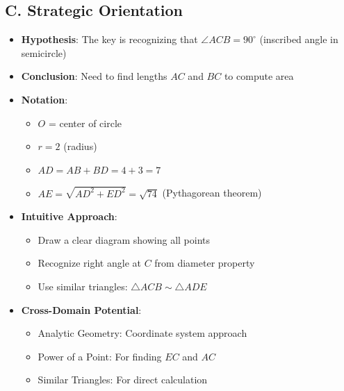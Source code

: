 \documentclass[]{article}
\begin{document}
\begin{problemconfigbox}
\subsection*{C. Strategic Orientation}
\begin{itemize}[leftmargin=*]
    \item \textbf{Hypothesis}: The key is recognizing that $\angle ACB = 90^\circ$ (inscribed angle in semicircle)
    \item \textbf{Conclusion}: Need to find lengths $AC$ and $BC$ to compute area
    \item \textbf{Notation}: 
    \begin{itemize}
        \item $O$ = center of circle
        \item $r = 2$ (radius)
        \item $AD = AB + BD = 4 + 3 = 7$
        \item $AE = \sqrt{AD^2 + ED^2} = \sqrt{74}$ (Pythagorean theorem)
    \end{itemize}
    \item \textbf{Intuitive Approach}: 
    \begin{itemize}
        \item Draw a clear diagram showing all points
        \item Recognize right angle at $C$ from diameter property
        \item Use similar triangles: $\triangle ACB \sim \triangle ADE$
    \end{itemize}
    \item \textbf{Cross-Domain Potential}: 
    \begin{itemize}
        \item Analytic Geometry: Coordinate system approach
        \item Power of a Point: For finding $EC$ and $AC$
        \item Similar Triangles: For direct calculation
    \end{itemize}
\end{itemize}
\end{problemconfigbox}
\end{document}
